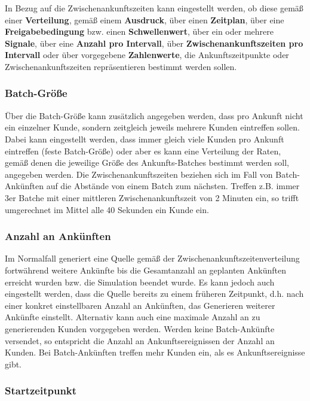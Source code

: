 In Bezug auf die Zwischenankunftszeiten kann eingestellt werden, ob diese gemäß einer
\textbf{Verteilung}, gemäß einem \textbf{Ausdruck}, über einen \textbf{Zeitplan}, über eine
\textbf{Freigabebedingung} bzw. einen \textbf{Schwellenwert}, über ein oder mehrere
\textbf{Signale}, über eine \textbf{Anzahl pro Intervall}, über \textbf{Zwischenankunftszeiten pro Intervall}
oder über vorgegebene \textbf{Zahlenwerte}, die Ankunftszeitpunkte oder Zwischenankunftszeiten
repräsentieren bestimmt werden sollen.

\subsubsection*{Batch-Größe}

Über die Batch-Größe kann zusätzlich
angegeben werden, dass pro Ankunft nicht ein einzelner Kunde, sondern zeitgleich jeweils
mehrere Kunden eintreffen sollen. Dabei kann eingestellt werden, dass immer gleich
viele Kunden pro Ankunft eintreffen (feste Batch-Größe) oder aber es kann eine Verteilung
der Raten, gemäß denen die jeweilige Größe des Ankunfts-Batches bestimmt werden soll,
angegeben werden.
Die Zwischenankunftszeiten beziehen sich im Fall von Batch-Ankünften auf die Abstände von
einem Batch zum nächsten. Treffen z.B. immer 3er Batche mit einer mittleren Zwischenankunftszeit
von 2 Minuten ein, so trifft umgerechnet im Mittel alle 40 Sekunden ein Kunde ein.

\subsubsection*{Anzahl an Ankünften}

Im Normalfall generiert eine Quelle gemäß der Zwischenankunftszeitenverteilung fortwährend
weitere Ankünfte bis die Gesamtanzahl an geplanten Ankünften erreicht wurden bzw. die Simulation beendet wurde.
Es kann jedoch auch eingestellt werden, dass die Quelle bereits zu einem früheren Zeitpunkt,
d.h. nach einer konkret einstellbaren Anzahl an Ankünften, das Generieren weiterer Ankünfte einstellt.
Alternativ kann auch eine maximale Anzahl an zu generierenden Kunden vorgegeben werden.
Werden keine Batch-Ankünfte versendet, so entspricht die Anzahl an Ankunftsereignissen der
Anzahl an Kunden. Bei Batch-Ankünften treffen mehr Kunden ein, als es Ankunftsereignisse gibt.

\subsubsection*{Startzeitpunkt}

